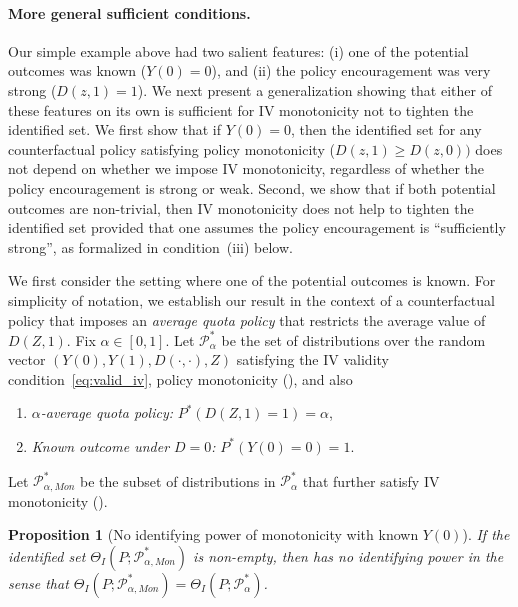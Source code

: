 \documentclass[12pt]{article}%
\newtheorem{prop}{Proposition}
\theoremstyle{definition}
\newcommand\1{\operatorname{I}\indicatorfence}
\begin{document}
\paragraph{More general sufficient conditions.} Our simple example above had two
salient features: (i) one of the potential outcomes was known ($Y(0)=0$), and
(ii) the policy encouragement was very strong ($D(z,1)=1$). We next present a
generalization showing that either of these features on its own is sufficient
for IV monotonicity not to tighten the identified set. We first show that if
$Y(0)=0$, then the identified set for any counterfactual policy satisfying
policy monotonicity ($D(z,1) \geq D(z,0))$ does not depend on whether we impose
IV monotonicity, regardless of whether the policy encouragement is strong or
weak. Second, we show that if both potential outcomes are non-trivial, then IV
monotonicity does not help to tighten the identified set provided that one
assumes the policy encouragement is ``sufficiently strong'', as formalized in
condition~(iii) below.

We first consider the setting where one of the potential outcomes is known. For
simplicity of notation, we establish our result in the context of a
counterfactual policy that imposes an \emph{average quota policy} that restricts
the average value of $D(Z,1)$. Fix $\alpha \in [0,1]$. Let
$\mathcal{P}_{\alpha}^*$ be the set of distributions over the random vector
$(Y(0), Y(1), D(\cdot, \cdot), Z)$ satisfying the \ac{IV} validity
condition~\eqref{eq:valid_iv}, policy monotonicity
(), and also
\begin{enumerate}
\item [(i)] \emph{$\alpha$-average quota policy:} $P^*(D(Z,1)=1) = \alpha$,
\item [(ii)] \emph{Known outcome under $D=0$:} $P^*(Y(0) = 0)=1$.
\end{enumerate}
Let $\mathcal{P}^*_{\alpha, Mon}$ be the subset of distributions in
$\mathcal{P}_{\alpha}^*$ that further satisfy IV monotonicity
().

\begin{prop}[No identifying power of monotonicity with known $Y(0)$]\label{prop:monotonicity_is_not_helpful}
If the identified set $\Theta_I(P; \mathcal{P}^*_{\alpha, Mon})$ is non-empty, then  has no identifying power in the sense that $\Theta_I(P; \mathcal{P}^*_{\alpha, Mon})=\Theta_I(P; \mathcal{P}_{\alpha}^*)$.
\end{prop}
\end{document}
